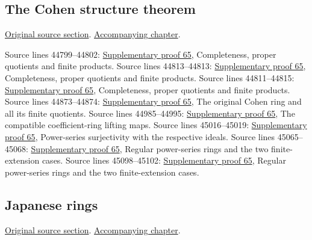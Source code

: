 \subsection{The Cohen structure theorem}
\hypertarget{algebra-source-section-cohen-structure-theorem}{}
\noindent\href{https://github.com/stacks/stacks-project/blob/a04446e57ec1fbc252a871afcec7752fb2807b14/algebra.tex\#L44779}{Original source section}. \href{algebra.pdf\#nameddest=section-cohen-structure-theorem}{Accompanying chapter}.

\begin{AlgebraSourceRoutes}
 Source lines 44799--44802: \hyperlink{algebra_cohen_notes_20260929}{Supplementary proof 65}, Completeness, proper quotients and finite products.
 Source lines 44813--44813: \hyperlink{algebra_cohen_notes_20260929}{Supplementary proof 65}, Completeness, proper quotients and finite products.
 Source lines 44811--44815: \hyperlink{algebra_cohen_notes_20260929}{Supplementary proof 65}, Completeness, proper quotients and finite products.
 Source lines 44873--44874: \hyperlink{algebra_cohen_notes_20260929}{Supplementary proof 65}, The original Cohen ring and all its finite quotients.
 Source lines 44985--44995: \hyperlink{algebra_cohen_notes_20260929}{Supplementary proof 65}, The compatible coefficient-ring lifting maps.
 Source lines 45016--45019: \hyperlink{algebra_cohen_notes_20260929}{Supplementary proof 65}, Power-series surjectivity with the respective ideals.
 Source lines 45065--45068: \hyperlink{algebra_cohen_notes_20260929}{Supplementary proof 65}, Regular power-series rings and the two finite-extension cases.
 Source lines 45098--45102: \hyperlink{algebra_cohen_notes_20260929}{Supplementary proof 65}, Regular power-series rings and the two finite-extension cases.
\end{AlgebraSourceRoutes}

\subsection{Japanese rings}
\hypertarget{algebra-source-section-japanese}{}
\noindent\href{https://github.com/stacks/stacks-project/blob/a04446e57ec1fbc252a871afcec7752fb2807b14/algebra.tex\#L45128}{Original source section}. \href{algebra.pdf\#nameddest=section-japanese}{Accompanying chapter}.

